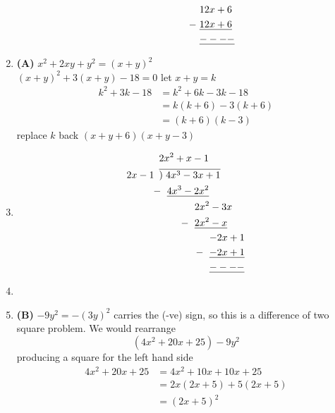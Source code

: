 \begin{multicols}{2}
\begin{enumerate}[label={\textbf{\arabic*.}}]
\begin{align*}
        & \hspace{63pt} 12x + 6   \\
       -\hspace{-60pt} & \hspace{63pt} \underline{12x + 6} \\
        & \hspace{63pt} \underline{----}
    \end{align*}
    \item \textbf{(A)} $x^2 + 2xy + y^2 = (x+y)^2$ \\
    $(x+y)^2 + 3(x+y) - 18 = 0$ let $x+y = k $ 
    \begin{align*}
    k^2 + 3k -18 &= k^2 + 6k - 3k -18 \\
    & = k(k+6)-3(k+6) \\
    &= (k+6)(k-3)
    \end{align*}
    replace $k$ back $(x+y+6)(x+y-3)$
    \item 
    \begin{align*}
        & 2x^2 + x - 1  \\
      2x - 1\hspace{5pt}  & \overline{)\hspace{3pt} 4x^3 - 3x + 1} \\
     -\hspace{-2pt} &\hspace{8pt} \underline{4x^3 - 2x^2} \\
      & \hspace{36pt} 2x^2 - 3x \\
    -\hspace{-30pt}  & \hspace{36pt} \underline{2x^2 -x} \\
    & \hspace{51pt} {-2x + 1} \\
  -\hspace{-45pt}  & \hspace{51pt} \underline{-2x + 1} \\
  & \hspace{51pt} \underline{----}
    \end{align*}
    \item
\item \textbf{(B)} $-9y^2 = -(3y)^2 $ carries the (-ve) sign, so this is a difference of two square problem. We would rearrange
    $$(4x^2 + 20x + 25) - 9y^2$$ 
    producing a square for the left hand side 
    \begin{align*}
    4x^2 + 20x + 25 &= 4x^2 + 10x  +10x + 25\\ &= 2x(2x + 5) + 5(2x+5)\\ &= (2x+5)^2

\end{align*}
\end{enumerate}
\end{multicols}
